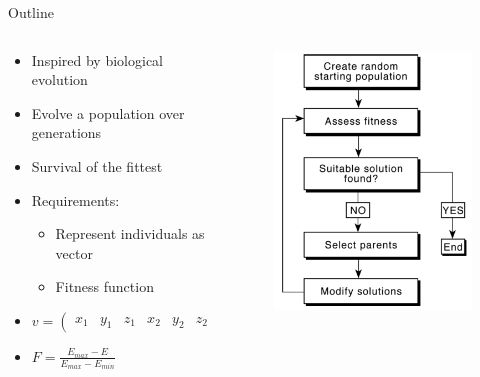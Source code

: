 \documentclass[10pt]{beamer}
\begin{document}
{%
\begin{frame}{Outline}
	\begin{columns}[c] %
		\begin{column}{.48\textwidth}
			\begin{itemize}
				\item {Inspired by biological evolution}
				\item {Evolve a population over generations}
				\item {Survival of the fittest}
				\item {Requirements:}
				\begin{itemize}
					\item {Represent individuals as vector}
					\item {Fitness function}
				\end{itemize}
				\item{$v = \left(\begin{smallmatrix}
					x_1 & y_1 & z_1 & x_2 &  y_2 & z_2 &
					... & x_N & y_N & z_N
					\end{smallmatrix}\right)$}
				\item{$F = \frac{E_{max} - E}{E_{max} - E_{min}}$}
			\end{itemize}

		\end{column}
		\hfill
		\begin{column}{0.48\textwidth}
			\begin{figure}
			\includegraphics[width=0.8\linewidth]{images/GA_outline_Carwright.PNG}
			\end{figure}
		\end{column}	
	\end{columns}
\end{frame}
}
\end{document}
